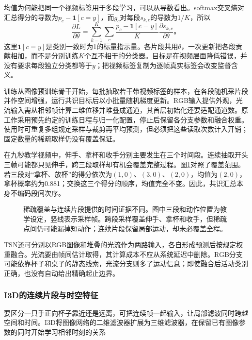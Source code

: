 均值为何能把同一个视频标签用于多段学习，可以从导数看出。softmax交叉熵对汇总得分的导数为$p_c-\bm{1}[c=y]$，而$g_c$对每段$s_{k,c}$的导数为$1/K$，所以
\[
  \frac{\partial L}{\partial\theta}
  =\sum_{k=1}^{K}\sum_c
    \frac{p_c-\bm{1}[c=y]}{K}
    \frac{\partial s_{k,c}}{\partial\theta}\text{。}
\]
这里$\bm{1}[c=y]$是类别一致时为1的标量指示量。各片段共用$\theta$，一次更新把各段贡献相加，而不是分别训练$K$个互不相干的分类器。目标是在视频层面降低错误，并没有要求每段独立分类都等于$y$；把视频标签复制为逐帧真实标签会改变监督含义。

训练从图像预训练骨干开始，每批抽取若干带视频标签的样本，在各段随机采片段并作空间增强，运行共识目标后以小批量随机梯度更新。RGB输入提供外观，光流输入需从相邻帧计算二维位移并堆叠成通道，其首层初始化还要适配通道数。原工作采用预先约定的训练日程与归一化配置，停止后保留各分支参数和融合权重。使用时可重复多组规定采样与裁剪再平均预测，但必须把这些读取次数计入开销；固定数量的稀疏取样仍没有覆盖保证。

在九秒教学视频中，伸手、拿杯和收手分别主要发生在三个时间段。连续抽取开头三帧可能都只见伸手，跨三段取样却有机会覆盖完整过程。图\ref{fig:vision-temporal-sampling}对照了覆盖范围。若三段对“拿杯、放杯”的得分依次为$(1,0)$、$(3,0)$、$(2,0)$，均值为$(2,0)$，拿杯概率约为0.881；交换这三个得分的顺序，均值完全不变。因此，共识汇总本身不编码段间次序。

\begin{figure}[htbp]
  \centering
  
  \caption{稀疏覆盖与连续片段提供的时间证据不同。图中三段和动作位置为教学设定，竖线表示采样帧。跨段采样覆盖伸手、拿杯和收手，但稀疏点间仍可能漏掉短动作；连续片段保留局部运动，却未必覆盖全程。}
  \label{fig:vision-temporal-sampling}
\end{figure}

TSN还可分别以RGB图像和堆叠的光流作为两路输入，各自形成预测后按规定权重融合。光流要由帧间估计取得，其计算成本不应从系统延迟中删除。RGB分支可能依靠杯子和桌子的静态线索，光流分支则多了运动信息；即使融合后活动类别正确，也没有自动给出精确起止边界。

\subsubsection{I3D的连续片段与时空特征}
\label{sec:vision-video-i3d}

要区分一只手正向杯子靠近还是远离，可把连续帧一起输入，让局部滤波同时跨越空间和时间。I3D将图像网络的二维滤波器扩展为三维滤波器，在保留已有图像参数的同时开始学习相邻时刻的关系

